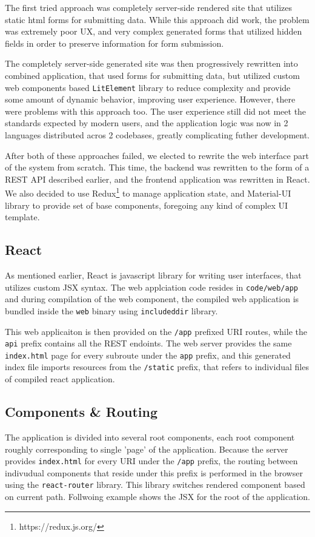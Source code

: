 The first tried approach was completely server-side rendered site that utilizes static html forms for
submitting data. While this approach did work, the problem was extremely poor UX, and very complex generated forms that utilized hidden fields in order to preserve information
for form submission.

The completely server-side generated site was then progressively rewritten into combined
application, that used forms for submitting data, but utilized custom web components
based \verb|LitElement| library to reduce complexity and provide some amount of dynamic behavior, improving
user experience. However, there were problems with this approach too. The user experience still did not meet the
standards expected by modern users, and the application logic was now in 2 languages distributed acros 2 codebases,
greatly complicating futher development.

After both of these approaches failed, we elected to rewrite the web interface part of the system from scratch.
This time, the backend was rewritten to the form of a REST API described earlier, and the frontend application
was rewritten in React. We also decided to use Redux\footnote{https://redux.js.org/} to manage application state,
and Material-UI library to provide set of base components, foregoing any kind of complex UI template.

\subsection{React}
As mentioned earlier, React is javascript library for writing user interfaces, that utilizes custom JSX syntax.
The web applciation code resides in \verb|code/web/app| and during compilation of the web component, the
compiled web application is bundled inside the \verb|web| binary using \verb|includeddir| library.

This web applicaiton is then provided on the \verb|/app| prefixed URI routes, while the \verb|api| prefix
contains all the REST endoints. The web server provides the same \verb|index.html| page for every subroute under
the \verb|app| prefix, and this generated index file imports resources from the \verb|/static| prefix, that
refers to individual files of compiled react application.

\subsection{Components \& Routing}
The application is divided into several root components, each root component roughly corresponding to single
'page' of the application. Because the server provides \verb|index.html| for every URI under the \verb|/app| prefix, the
routing between indivudual components that reside under this prefix is performed in the browser using the
\verb|react-router| library. This library switches rendered component based on current path.
Follwoing example shows the JSX for the root of the application.

